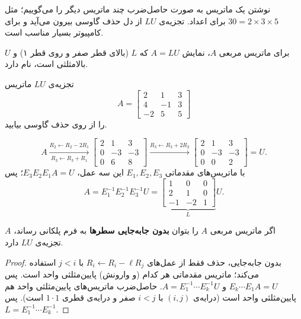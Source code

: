 نوشتن یک ماتریس به صورت حاصل‌ضرب چند ماتریس دیگر را  می‌گوییم؛ مثل $30=2\times3\times5$ برای اعداد. تجزیه‌ی $LU$ از دل حذف گاوسی  بیرون می‌آید و برای کامپیوتر بسیار مناسب است.

\begin{definition}[تجزیه‌ی $LU$]
برای ماتریس مربعی $A$، نمایش $A=LU$ که $L$  (بالای قطر صفر و روی قطر ۱) و $U$ بالامثلثی است،  نام دارد.
\end{definition}

\begin{example}
تجزیه‌ی $LU$ ماتریس 
\[
A=\begin{bmatrix}2&1&3\\4&-1&3\\-2&5&5\end{bmatrix}
\]
را از روی حذف گاوسی بیابید.
\end{example}
\begin{solution}
\[
A\xrightarrow[R_3\leftarrow R_3+R_1]{R_2\leftarrow R_2-2R_1}
\begin{bmatrix}2&1&3\\0&-3&-3\\0&6&8\end{bmatrix}
\xrightarrow{R_3\leftarrow R_3+2R_2}
\begin{bmatrix}2&1&3\\0&-3&-3\\0&0&2\end{bmatrix}=U .
\]
با ماتریس‌های مقدماتی $E_1,E_2,E_3$ این سه عمل، $E_3E_2E_1A=U$؛ پس
\[
A=E_1^{-1}E_2^{-1}E_3^{-1}U=\underbrace{\begin{bmatrix}1&0&0\\2&1&0\\-1&-2&1\end{bmatrix}}_{L}U .
\]
\end{solution}

\begin{theorem}
اگر ماتریس مربعی $A$ را بتوان \textbf{بدون جابه‌جایی سطرها} به فرم پلکانی رساند، $A$ تجزیه‌ی $LU$ دارد.
\end{theorem}
\begin{proof}
بدون جابه‌جایی، حذف فقط از عمل‌های $R_i\leftarrow R_i-\ell R_j$ با $j<i$ استفاده می‌کند؛ ماتریس مقدماتی  هر کدام (و وارونش) پایین‌مثلثی واحد است. پس $E_k\cdots E_1A=U$ و $A=E_1^{-1}\cdots E_k^{-1}U$. حاصل‌ضرب ماتریس‌های پایین‌مثلثی واحد هم پایین‌مثلثی واحد است (درایه‌ی $(i,j)$ با $i<j$ صفر و درایه‌ی قطری $1\cdot1$ است). پس $L=E_1^{-1}\cdots E_k^{-1}$.
\end{proof}

